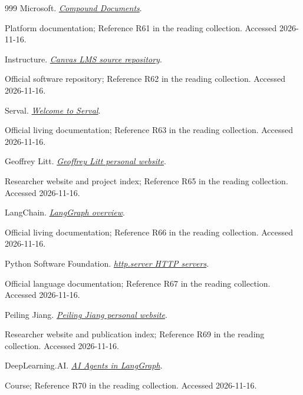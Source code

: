 \documentclass[11pt,letterpaper]{article}
\begin{document}
\begin{thebibliography}{999}
Microsoft.
\href{https://learn.microsoft.com/en-us/windows/win32/com/compound-documents}{\emph{Compound Documents}}.
\par {\small Platform documentation; Reference R61 in the reading collection.}
{\small Accessed 2026-11-16.}

Instructure.
\href{https://github.com/instructure/canvas-lms}{\emph{Canvas LMS source repository}}.
\par {\small Official software repository; Reference R62 in the reading collection.}
{\small Accessed 2026-11-16.}

Serval.
\href{https://docs.serval.com/sections/documentation/overview/welcome}{\emph{Welcome to Serval}}.
\par {\small Official living documentation; Reference R63 in the reading collection.}
{\small Accessed 2026-11-16.}

Geoffrey Litt.
\href{https://www.geoffreylitt.com/}{\emph{Geoffrey Litt personal website}}.
\par {\small Researcher website and project index; Reference R65 in the reading collection.}
{\small Accessed 2026-11-16.}

LangChain.
\href{https://docs.langchain.com/oss/python/langgraph/overview}{\emph{LangGraph overview}}.
\par {\small Official living documentation; Reference R66 in the reading collection.}
{\small Accessed 2026-11-16.}

Python Software Foundation.
\href{https://docs.python.org/3/library/http.server.html}{\emph{http.server HTTP servers}}.
\par {\small Official language documentation; Reference R67 in the reading collection.}
{\small Accessed 2026-11-16.}

Peiling Jiang.
\href{https://jiang.pl/}{\emph{Peiling Jiang personal website}}.
\par {\small Researcher website and publication index; Reference R69 in the reading collection.}
{\small Accessed 2026-11-16.}

DeepLearning.AI.
\href{https://www.deeplearning.ai/courses/ai-agents-in-langgraph}{\emph{AI Agents in LangGraph}}.
\par {\small Course; Reference R70 in the reading collection.}
{\small Accessed 2026-11-16.}


\end{thebibliography}
\end{document}

